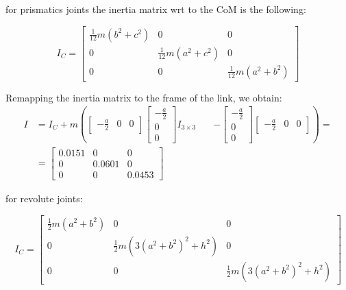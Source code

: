 \documentclass{article}
\begin{document}
for prismatics joints the inertia matrix wrt to the CoM is the following:

\begin{equation}
    I_C = \begin{bmatrix}
        \frac{1}{12}m(b^2 + c^2) & 0                        & 0                        \\
        0                        & \frac{1}{12}m(a^2 + c^2) & 0                        \\
        0                        & 0                        & \frac{1}{12}m(a^2 + b^2)
    \end{bmatrix}
\end{equation}

Remapping the inertia matrix to the frame of the link, we obtain:
\begin{align}
    I & = I_C + m \left( \begin{bmatrix} -\frac{a}{2} & 0 & 0 \end{bmatrix} \begin{bmatrix} -\frac{a}{2} \\ 0 \\ 0 \end{bmatrix} I_{3 \times 3} \right. \nonumber
      & \quad \left. - \begin{bmatrix} -\frac{a}{2} \\ 0 \\ 0 \end{bmatrix} \begin{bmatrix} -\frac{a}{2} & 0 & 0 \end{bmatrix} \right) =                          \\
      & = \begin{bmatrix}
              0.0151 & 0      & 0      \\
              0      & 0.0601 & 0      \\
              0      & 0      & 0.0453
          \end{bmatrix}
\end{align}


for revolute joints:

\begin{equation}
    I_C = \begin{bmatrix}
        \frac{1}{2}m(a^2 + b^2) & 0                                  & 0                                  \\
        0                       & \frac{1}{2}m(3(a^2 + b^2)^2 + h^2) & 0                                  \\
        0                       & 0                                  & \frac{1}{2}m(3(a^2 + b^2)^2 + h^2)
    \end{bmatrix}
\end{equation}
\end{document}
